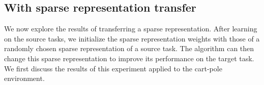 
\subsection{With sparse representation transfer} %
\label{sub:cartpole:with_sparse_representation_transfer}
We now explore the results of transferring a sparse representation. After learning on the source tasks, we initialize the sparse representation weights with those of a randomly chosen sparse representation of a source task. The algorithm can then change this sparse representation to improve its performance on the target task. We first discuss the results of this experiment applied to the cart-pole environment.
